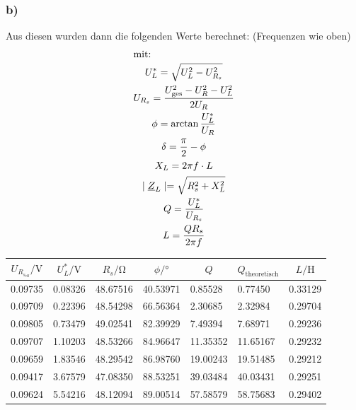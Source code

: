\documentclass[a4paper, 12pt]{article}
\begin{document}
     \subsubsection*{b)}
     \noindent Aus diesen wurden dann die folgenden Werte berechnet: (Frequenzen wie oben)
     \begin{gather*}
       \intertext{mit:}
       U_L^* = \sqrt{U^2_L - U_{R_{s}}^2}\\
       U_{R_{s}} = \frac{U_{\text{ges}}^2 - U_R^2 - U_L^2}{2 U_R}\\
       \phi = \arctan{\frac{U_L^*}{U_R}}\\
       \delta = \frac{\pi}{2} - \phi\\
       X_L = 2 \pi f \cdot L\\
       \mid \underline{Z}_L \mid = \sqrt{R_s^2 + X_L^2}\\
       Q = \frac{U_L^*}{U_{R_{s}}}\\
       L = \frac{Q R_s}{2 \pi f}\\
     \end{gather*}
      \begin{table}[H]
      \begin{center}
      \begin{tabular}{@{}lllllll@{}}
      \toprule
      \multicolumn{1}{c}{$U_{R_{s_{\text{eff}}}}/\si{\volt}$}     & \multicolumn{1}{c}{$U_L^*/\si{\volt}$}     & \multicolumn{1}{c}{$R_s/\si{\ohm}$}   & \multicolumn{1}{c}{$\phi/\si{\degree}$}      & \multicolumn{1}{c}{$Q$}       & \multicolumn{1}{c}{$Q_{\text{theoretisch}}$}   & \multicolumn{1}{c}{$L/\si{\henry}$} \\ \midrule
      0.09735 & 0.08326 & 48.67516 & 40.53971 & 0.85528  & 0.77450  & 0.33129   \\
      0.09709 & 0.22396 & 48.54298 & 66.56364 & 2.30685  & 2.32984  & 0.29704   \\
      0.09805 & 0.73479 & 49.02541 & 82.39929 & 7.49394  & 7.68971  & 0.29236   \\
      0.09707 & 1.10203 & 48.53266 & 84.96647 & 11.35352 & 11.65167 & 0.29232   \\
      0.09659 & 1.83546 & 48.29542 & 86.98760 & 19.00243 & 19.51485 & 0.29212   \\
      0.09417 & 3.67579 & 47.08350 & 88.53251 & 39.03484 & 40.03431 & 0.29251   \\
      0.09624 & 5.54216 & 48.12094 & 89.00514 & 57.58579 & 58.75683 & 0.29402   \\ \bottomrule
      \end{tabular}
      \end{center}
      \end{table}
\end{document}
